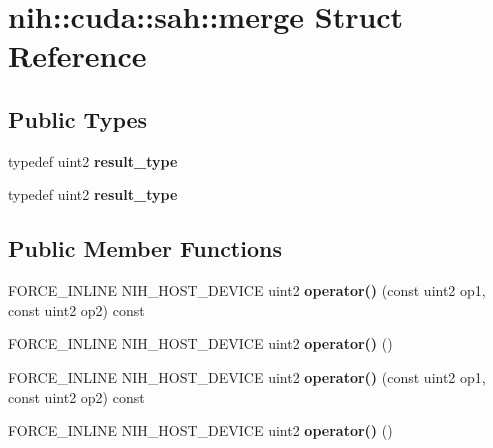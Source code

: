 \hypertarget{structnih_1_1cuda_1_1sah_1_1merge}{
\section{nih\-:\-:cuda\-:\-:sah\-:\-:merge \-Struct \-Reference}
\label{structnih_1_1cuda_1_1sah_1_1merge}
}
\subsection*{\-Public \-Types}
\begin{DoxyCompactItemize}
\item 
\hypertarget{structnih_1_1cuda_1_1sah_1_1merge_a27cd3b31eac12188ebd66becd25f4b41}{
typedef uint2 {\bfseries result\-\_\-type}}
\label{structnih_1_1cuda_1_1sah_1_1merge_a27cd3b31eac12188ebd66becd25f4b41}

\item 
\hypertarget{structnih_1_1cuda_1_1sah_1_1merge_a27cd3b31eac12188ebd66becd25f4b41}{
typedef uint2 {\bfseries result\-\_\-type}}
\label{structnih_1_1cuda_1_1sah_1_1merge_a27cd3b31eac12188ebd66becd25f4b41}

\end{DoxyCompactItemize}
\subsection*{\-Public \-Member \-Functions}
\begin{DoxyCompactItemize}
\item 
\hypertarget{structnih_1_1cuda_1_1sah_1_1merge_a3f158807c44ef483cb86a948a8c848e3}{
\-F\-O\-R\-C\-E\-\_\-\-I\-N\-L\-I\-N\-E \-N\-I\-H\-\_\-\-H\-O\-S\-T\-\_\-\-D\-E\-V\-I\-C\-E uint2 {\bfseries operator()} (const uint2 op1, const uint2 op2) const }
\label{structnih_1_1cuda_1_1sah_1_1merge_a3f158807c44ef483cb86a948a8c848e3}

\item 
\hypertarget{structnih_1_1cuda_1_1sah_1_1merge_a2ca3a59c304ace1bdf8e6610717d0a85}{
\-F\-O\-R\-C\-E\-\_\-\-I\-N\-L\-I\-N\-E \-N\-I\-H\-\_\-\-H\-O\-S\-T\-\_\-\-D\-E\-V\-I\-C\-E uint2 {\bfseries operator()} ()}
\label{structnih_1_1cuda_1_1sah_1_1merge_a2ca3a59c304ace1bdf8e6610717d0a85}

\item 
\hypertarget{structnih_1_1cuda_1_1sah_1_1merge_a3f158807c44ef483cb86a948a8c848e3}{
\-F\-O\-R\-C\-E\-\_\-\-I\-N\-L\-I\-N\-E \-N\-I\-H\-\_\-\-H\-O\-S\-T\-\_\-\-D\-E\-V\-I\-C\-E uint2 {\bfseries operator()} (const uint2 op1, const uint2 op2) const }
\label{structnih_1_1cuda_1_1sah_1_1merge_a3f158807c44ef483cb86a948a8c848e3}

\item 
\hypertarget{structnih_1_1cuda_1_1sah_1_1merge_a2ca3a59c304ace1bdf8e6610717d0a85}{
\-F\-O\-R\-C\-E\-\_\-\-I\-N\-L\-I\-N\-E \-N\-I\-H\-\_\-\-H\-O\-S\-T\-\_\-\-D\-E\-V\-I\-C\-E uint2 {\bfseries operator()} ()}
\label{structnih_1_1cuda_1_1sah_1_1merge_a2ca3a59c304ace1bdf8e6610717d0a85}

\end{DoxyCompactItemize}


